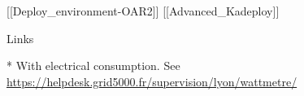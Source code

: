 \documentclass[final]{beamer}
\newlength{\onecolwid}
\begin{document}
\begin{frame}[t]
\begin{columns}[t]
\begin{column}{\onecolwid}
\begin{alertblock}{[[Deploy\_environment-OAR2]] [[Advanced\_Kadeploy]]}

\end{alertblock}



\begin{alertblock}{Links}

\end{alertblock}


* With electrical consumption.
See \url{https://helpdesk.grid5000.fr/supervision/lyon/wattmetre/}

\end{column} %

\end{columns} %

\end{frame} %
\end{document}
